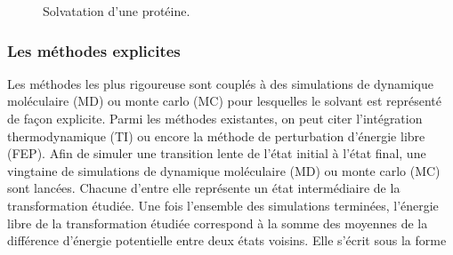\begin{figure}[H]
  \center
      \caption{Solvatation d'une protéine.}
      \label{fig:solvatation_def}
\end{figure}



\subsubsection{Les méthodes explicites}
Les méthodes les plus rigoureuse sont couplés à des simulations de dynamique moléculaire (MD) ou monte carlo (MC) pour lesquelles le solvant est représenté de façon explicite. Parmi les méthodes existantes\cite{Skyner_review_2015, Hansen_Practical_2014, Christ_basic_2009}, on peut citer l'intégration thermodynamique (TI) ou encore la méthode de perturbation d'énergie libre (FEP). Afin de simuler une transition lente de l'état initial à l'état final, une vingtaine de simulations de dynamique moléculaire (MD) ou monte carlo (MC) sont lancées. Chacune d'entre elle représente un état intermédiaire de la transformation étudiée. Une fois l'ensemble des simulations terminées, l'énergie libre de la transformation étudiée correspond à la somme des moyennes de la différence d'énergie potentielle entre deux états voisins. Elle s'écrit sous la forme

